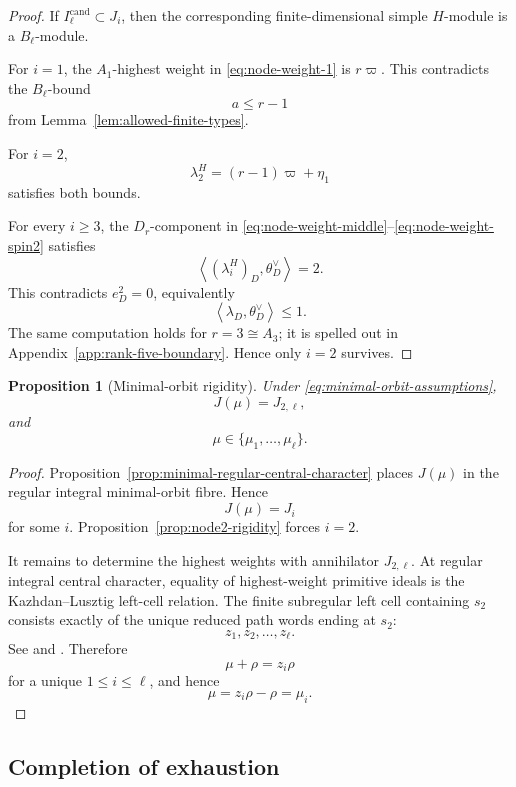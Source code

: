\documentclass[11pt]{amsart}
\newtheorem{proposition}[theorem]{Proposition}
\theoremstyle{remark}
\numberwithin{equation}{section}
\begin{document}
\begin{proof}
If \(I_\ell^{\mathrm{cand}}\subset J_i\), then the corresponding
finite-dimensional simple \(H\)-module is a \(B_\ell\)-module.

For \(i=1\), the \(A_1\)-highest weight in
\eqref{eq:node-weight-1} is \(r\varpi\).  This contradicts the
\(B_\ell\)-bound
\[
   a\le r-1
\]
from Lemma~\ref{lem:allowed-finite-types}.

For \(i=2\),
\[
   \lambda_2^H
   =
   (r-1)\varpi+\eta_1
\]
satisfies both bounds.

For every \(i\ge3\), the \(D_r\)-component in
\eqref{eq:node-weight-middle}--\eqref{eq:node-weight-spin2} satisfies
\[
   \left\langle
      (\lambda_i^H)_D,\theta_D^\vee
   \right\rangle
   =
   2.
\]
This contradicts \(e_D^2=0\), equivalently
\[
   \left\langle
      \lambda_D,\theta_D^\vee
   \right\rangle
   \le1.
\]
The same computation holds for \(r=3\cong A_3\); it is spelled out in
Appendix~\ref{app:rank-five-boundary}.  Hence only \(i=2\) survives.
\end{proof}

\begin{proposition}[Minimal-orbit rigidity]
\label{prop:minimal-orbit-rigidity}
Under \eqref{eq:minimal-orbit-assumptions},
\[
   J(\mu)=J_{2,\ell},
\]
and
\[
   \mu\in\{\mu_1,\ldots,\mu_\ell\}.
\]
\end{proposition}

\begin{proof}
Proposition~\ref{prop:minimal-regular-central-character} places \(J(\mu)\)
in the regular integral minimal-orbit fibre.  Hence
\[
   J(\mu)=J_i
\]
for some \(i\).  Proposition~\ref{prop:node2-rigidity} forces \(i=2\).

It remains to determine the highest weights with annihilator \(J_{2,\ell}\).
At regular integral central character, equality of highest-weight primitive
ideals is the Kazhdan--Lusztig left-cell relation.  The finite subregular
left cell containing \(s_2\) consists exactly of the unique reduced path
words ending at \(s_2\):
\[
   z_1,z_2,\ldots,z_\ell.
\]
See \cite[Chapter~12]{Bonnafe2017} and
\cite[Proposition~5.4]{Petukhov2018}.  Therefore
\[
   \mu+\rho=z_i\rho
\]
for a unique \(1\le i\le\ell\), and hence
\[
   \mu=z_i\rho-\rho=\mu_i.
\]
\end{proof}

\subsection{Completion of exhaustion}
\end{document}
